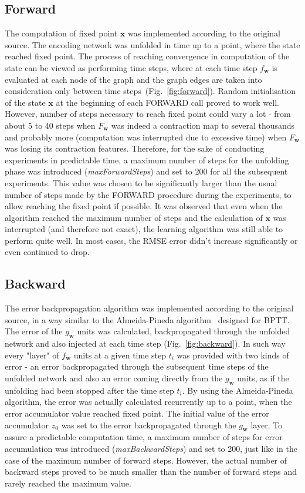 \documentclass[]{spie}  %
\newcommand{\bm}[1]{\boldsymbol{#1}}
\begin{document}
\subsection{Forward}
The computation of fixed point $\bm{x}$ was implemented according to the original source. The encoding network was unfolded in time up to a point, where the state reached fixed point. The process of reaching convergence in computation of the state can be viewed as performing time steps, where at each time step $f_{\bm{w}}$ is evaluated at each node of the graph and the graph edges are taken into consideration only between time steps~(Fig.~\ref{fig:forward}). Random initialisation of the state $\bm{x}$ at the beginning of each FORWARD call proved to work well. However, number of steps necessary to reach fixed point could vary a lot - from about 5 to 40 steps when $F_{\bm{w}}$ was indeed a contraction map to several thousands and probably more (computation was interrupted due to excessive time) when $F_{\bm{w}}$ was losing its contraction features. Therefore, for the sake of conducting experiments in predictable time, a maximum number of steps for the unfolding phase was introduced (\emph{maxForwardSteps}) and set to 200 for all the subsequent experiments. This value was chosen to be significantly larger than the usual number of steps made by the FORWARD procedure during the experiments, to allow reaching the fixed point if possible. It was observed that even when the algorithm reached the maximum number of steps and the calculation of $\bm{x}$ was interrupted (and therefore not exact), the learning algorithm was still able to perform quite well. In most cases, the RMSE error didn't increase significantly or even continued to drop.


\subsection{Backward}
The error backpropagation algorithm was implemented according to the original source, in a way similar to the Almeida-Pineda algorithm~\cite{williams1995gradient} designed for BPTT. The error of the $g_{\bm{w}}$ units was calculated, backpropagated through the unfolded network and also injected at each time step (Fig.~\ref{fig:backward}). In such way every "layer" of $f_{\bm{w}}$ units at a given time step $t_i$ was provided with two kinds of error - an error backpropagated through the subsequent time steps of the unfolded network and also an error coming directly from the $g_{\bm{w}}$ units, as if the unfolding had been stopped after the time step $t_i$. By using the Almeida-Pineda algorithm, the error was actually calculated recurrently up to a point, when the error accumulator value reached fixed point. The initial value of the error accumulator $z_0$ was set to the error backpropagated through the $g_{\bm{w}}$ layer. To assure a predictable computation time, a maximum number of steps for error accumulation was introduced (\emph{maxBackwardSteps}) and set to 200, just like in the case of the maximum number of forward steps. However, the actual number of backward steps proved to be much smaller than the number of forward steps and rarely reached the maximum value.
\end{document}
